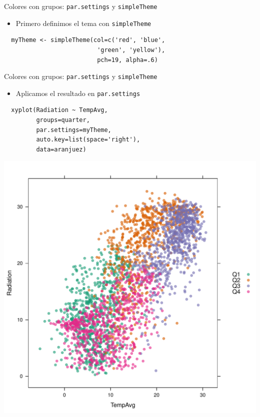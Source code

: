 \documentclass[xcolor={usenames,svgnames,dvipsnames}]{beamer}
\begin{document}
\begin{frame}[fragile,label=sec-2-1-22]{Colores con grupos: \texttt{par.settings} y \texttt{simpleTheme}}
 \begin{itemize}
\item Primero definimos el tema con \texttt{simpleTheme}
\end{itemize}
\lstset{language=R,label= ,caption= ,numbers=none}
\begin{lstlisting}
  myTheme <- simpleTheme(col=c('red', 'blue',
                          'green', 'yellow'),
                          pch=19, alpha=.6)
\end{lstlisting}
\end{frame}

\begin{frame}[fragile,label=sec-2-1-23]{Colores con grupos: \texttt{par.settings} y \texttt{simpleTheme}}
 \begin{itemize}
\item Aplicamos el resultado en \texttt{par.settings}
\end{itemize}
\lstset{language=R,label= ,caption= ,numbers=none}
\begin{lstlisting}
  xyplot(Radiation ~ TempAvg,
         groups=quarter,
         par.settings=myTheme,
         auto.key=list(space='right'),
         data=aranjuez)
\end{lstlisting}
\end{frame}

\begin{frame}[label=sec-2-1-24]{}
\includegraphics[width=.9\linewidth]{figs/myTheme.pdf}
\end{frame}
\end{document}
